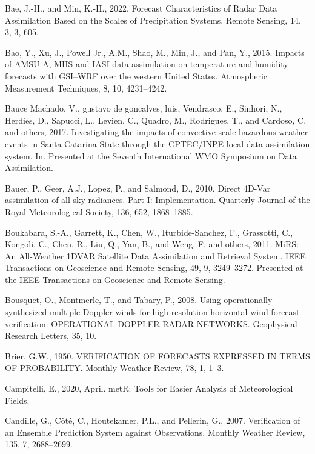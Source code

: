 \documentclass[12pt,oneside,a4paper]{reedthesis}
\begin{document}
\leavevmode\hypertarget{ref-bae2022}{}%
Bae, J.-H., and Min, K.-H., 2022. Forecast Characteristics of Radar Data Assimilation Based on the Scales of Precipitation Systems. Remote Sensing, 14, 3, 3, 605.

\leavevmode\hypertarget{ref-bao2015}{}%
Bao, Y., Xu, J., Powell Jr., A.M., Shao, M., Min, J., and Pan, Y., 2015. Impacts of AMSU-A, MHS and IASI data assimilation on temperature and humidity forecasts with GSI--WRF over the western United States. Atmospheric Measurement Techniques, 8, 10, 4231--4242.

\leavevmode\hypertarget{ref-baucemachado2017}{}%
Bauce Machado, V., gustavo de goncalves, luis, Vendrasco, E., Sinhori, N., Herdies, D., Sapucci, L., Levien, C., Quadro, M., Rodrigues, T., and Cardoso, C. and others, 2017. Investigating the impacts of convective scale hazardous weather events in Santa Catarina State through the CPTEC/INPE local data assimilation system. In. Presented at the Seventh International WMO Symposium on Data Assimilation.

\leavevmode\hypertarget{ref-bauer2010}{}%
Bauer, P., Geer, A.J., Lopez, P., and Salmond, D., 2010. Direct 4D-Var assimilation of all-sky radiances. Part I: Implementation. Quarterly Journal of the Royal Meteorological Society, 136, 652, 1868--1885.

\leavevmode\hypertarget{ref-boukabara2011}{}%
Boukabara, S.-A., Garrett, K., Chen, W., Iturbide-Sanchez, F., Grassotti, C., Kongoli, C., Chen, R., Liu, Q., Yan, B., and Weng, F. and others, 2011. MiRS: An All-Weather 1DVAR Satellite Data Assimilation and Retrieval System. IEEE Transactions on Geoscience and Remote Sensing, 49, 9, 3249--3272. Presented at the IEEE Transactions on Geoscience and Remote Sensing.

\leavevmode\hypertarget{ref-bousquet2008}{}%
Bousquet, O., Montmerle, T., and Tabary, P., 2008. Using operationally synthesized multiple-Doppler winds for high resolution horizontal wind forecast verification: OPERATIONAL DOPPLER RADAR NETWORKS. Geophysical Research Letters, 35, 10.

\leavevmode\hypertarget{ref-brier1950}{}%
Brier, G.W., 1950. VERIFICATION OF FORECASTS EXPRESSED IN TERMS OF PROBABILITY. Monthly Weather Review, 78, 1, 1--3.

\leavevmode\hypertarget{ref-campitelli2020}{}%
Campitelli, E., 2020, April. metR: Tools for Easier Analysis of Meteorological Fields.

\leavevmode\hypertarget{ref-candille2007}{}%
Candille, G., Côté, C., Houtekamer, P.L., and Pellerin, G., 2007. Verification of an Ensemble Prediction System against Observations. Monthly Weather Review, 135, 7, 2688--2699.
\end{document}
